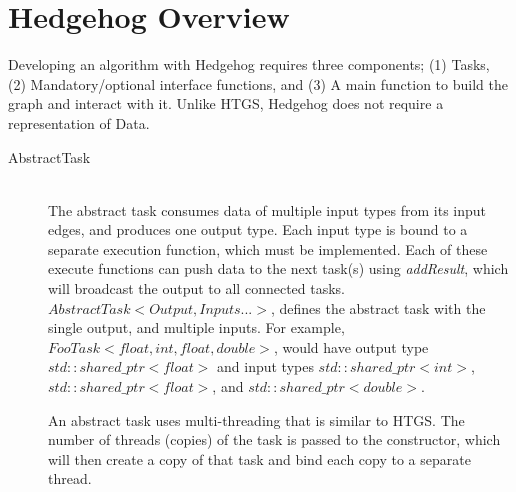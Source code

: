 \documentclass[]{article}
\begin{document}
\section{Hedgehog Overview}
Developing an algorithm with Hedgehog requires three components; (1) Tasks, (2) Mandatory/optional interface functions, and (3) A main function to build the graph and interact with it. Unlike HTGS, Hedgehog does not require a representation of Data.

\begin{description}
	\item[AbstractTask] \hfill \\
		The abstract task consumes data of multiple input types from its input edges, and produces one output type. Each input type is bound to a separate execution function, which must be implemented. Each of these execute functions can push data to the next task(s) using \textit{addResult}, which will broadcast the output to all connected tasks. $AbstractTask<Output, Inputs...>$, defines the abstract task with the single output, and multiple inputs. For example, $FooTask<float, int, float, double>$, would have output type $std::shared\_ptr<float>$ and input types $std::shared\_ptr<int>$, $std::shared\_ptr<float>$, and $std::shared\_ptr<double>$.
		
		An abstract task uses multi-threading that is similar to HTGS. The number of threads (copies) of the task is passed to the constructor, which will then create a copy of that task and bind each copy to a separate thread.
		

\end{description}
\end{document}
